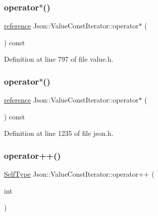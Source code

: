 \subsubsection{\texorpdfstring{operator$\ast$()}{operator*()}\hspace{0.1cm}{\footnotesize\ttfamily [1/2]}}
{\footnotesize\ttfamily \hyperlink{class_json_1_1_value_const_iterator_aa9b05c6a37cd352ea1ee6e13b816f709}{reference} Json\+::\+Value\+Const\+Iterator\+::operator$\ast$ (\begin{DoxyParamCaption}{ }\end{DoxyParamCaption}) const\hspace{0.3cm}{\ttfamily [inline]}}



Definition at line 797 of file value.\+h.

\hypertarget{class_json_1_1_value_const_iterator_ae5612dad47a6387eef71d584fb741d0c}{}\label{class_json_1_1_value_const_iterator_ae5612dad47a6387eef71d584fb741d0c} 
\subsubsection{\texorpdfstring{operator$\ast$()}{operator*()}\hspace{0.1cm}{\footnotesize\ttfamily [2/2]}}
{\footnotesize\ttfamily \hyperlink{class_json_1_1_value_const_iterator_aa9b05c6a37cd352ea1ee6e13b816f709}{reference} Json\+::\+Value\+Const\+Iterator\+::operator$\ast$ (\begin{DoxyParamCaption}{ }\end{DoxyParamCaption}) const\hspace{0.3cm}{\ttfamily [inline]}}



Definition at line 1235 of file json.\+h.

\hypertarget{class_json_1_1_value_const_iterator_ab3f0c2edbfc8f7d60645f3d597d05e28}{}\label{class_json_1_1_value_const_iterator_ab3f0c2edbfc8f7d60645f3d597d05e28} 
\subsubsection{\texorpdfstring{operator++()}{operator++()}\hspace{0.1cm}{\footnotesize\ttfamily [1/4]}}
{\footnotesize\ttfamily \hyperlink{class_json_1_1_value_iterator_base_a9d2a940d03ea06d20d972f41a89149ee}{Self\+Type} Json\+::\+Value\+Const\+Iterator\+::operator++ (\begin{DoxyParamCaption}\item[{int}]{ }\end{DoxyParamCaption})\hspace{0.3cm}{\ttfamily [inline]}}



